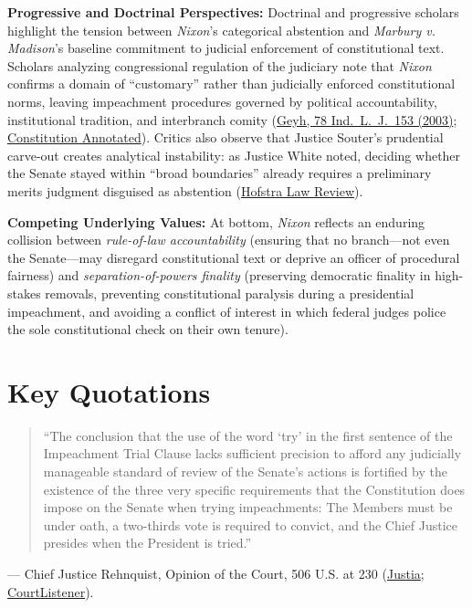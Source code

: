 \documentclass[12pt]{article}
\begin{document}
\textbf{Progressive and Doctrinal Perspectives:} Doctrinal and progressive scholars highlight the tension between \textit{Nixon}'s categorical abstention and \textit{Marbury v. Madison}'s baseline commitment to judicial enforcement of constitutional text. Scholars analyzing congressional regulation of the judiciary note that \textit{Nixon} confirms a domain of ``customary'' rather than judicially enforced constitutional norms, leaving impeachment procedures governed by political accountability, institutional tradition, and interbranch comity (\href{https://ilj.law.indiana.edu/articles/78/78_1_Geyh.pdf}{Geyh, 78 Ind.\ L.\ J.\ 153 (2003)}; \href{https://constitution.congress.gov/browse/essay/artII-S4-3/ALDE_00000698/}{Constitution Annotated}). Critics also observe that Justice Souter's prudential carve-out creates analytical instability: as Justice White noted, deciding whether the Senate stayed within ``broad boundaries'' already requires a preliminary merits judgment disguised as abstention (\href{https://scholarlycommons.law.hofstra.edu/cgi/viewcontent.cgi?article=2077&context=hlr}{Hofstra Law Review}).

\textbf{Competing Underlying Values:} At bottom, \textit{Nixon} reflects an enduring collision between \textit{rule-of-law accountability} (ensuring that no branch---not even the Senate---may disregard constitutional text or deprive an officer of procedural fairness) and \textit{separation-of-powers finality} (preserving democratic finality in high-stakes removals, preventing constitutional paralysis during a presidential impeachment, and avoiding a conflict of interest in which federal judges police the sole constitutional check on their own tenure).

\section{Key Quotations}

\begin{quote}
``The conclusion that the use of the word `try' in the first sentence of the Impeachment Trial Clause lacks sufficient precision to afford any judicially manageable standard of review of the Senate's actions is fortified by the existence of the three very specific requirements that the Constitution does impose on the Senate when trying impeachments: The Members must be under oath, a two-thirds vote is required to convict, and the Chief Justice presides when the President is tried.''
\end{quote}
\noindent --- Chief Justice Rehnquist, Opinion of the Court, 506 U.S. at 230 (\href{https://supreme.justia.com/cases/federal/us/506/224/}{Justia}; \href{https://www.courtlistener.com/opinion/112803/nixon-v-united-states/}{CourtListener}).
\end{document}
